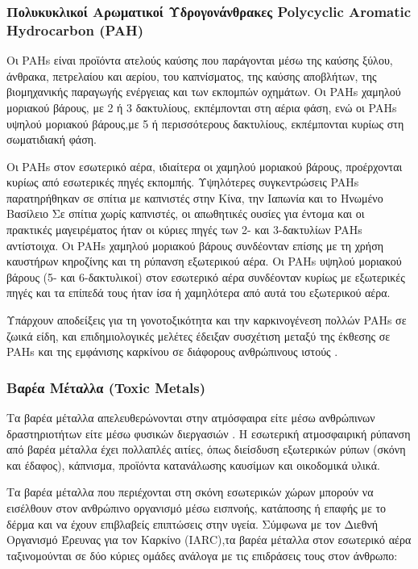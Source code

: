 \subsubsection{Πολυκυκλικοί Αρωματικοί Υδρογονάνθρακες Polycyclic Aromatic Hydrocarbon (PAH)}


Οι PAHs είναι προϊόντα ατελούς καύσης που παράγονται μέσω της καύσης ξύλου, άνθρακα, πετρελαίου και αερίου, του καπνίσματος, της καύσης αποβλήτων, της βιομηχανικής παραγωγής ενέργειας και των εκπομπών οχημάτων. Οι PAHs χαμηλού μοριακού βάρους, με 2 ή 3 δακτυλίους, εκπέμπονται στη αέρια φάση, ενώ οι PAHs υψηλού μοριακού βάρους,με 5 ή περισσότερους δακτυλίους, εκπέμπονται κυρίως στη σωματιδιακή φάση.

 Οι PAHs στον εσωτερικό αέρα, ιδιαίτερα οι χαμηλού μοριακού βάρους, προέρχονται κυρίως από εσωτερικές πηγές εκπομπής. Υψηλότερες συγκεντρώσεις PAHs παρατηρήθηκαν σε σπίτια με καπνιστές στην Κίνα, την Ιαπωνία και το Ηνωμένο Βασίλειο 
 Σε σπίτια χωρίς καπνιστές, οι απωθητικές ουσίες για έντομα και οι πρακτικές μαγειρέματος ήταν οι κύριες πηγές των 2- και 3-δακτυλίων PAHs αντίστοιχα. Οι PAHs χαμηλού μοριακού βάρους συνδέονταν επίσης με τη χρήση καυστήρων κηροζίνης και τη ρύπανση εξωτερικού αέρα. Οι PAHs υψηλού μοριακού βάρους (5- και 6-δακτυλικοί) στον εσωτερικό αέρα συνδέονταν κυρίως με εξωτερικές πηγές και τα επίπεδά τους ήταν ίσα ή χαμηλότερα από αυτά του εξωτερικού αέρα.


Υπάρχουν αποδείξεις για τη γονοτοξικότητα και την καρκινογένεση πολλών PAHs σε ζωικά είδη, και επιδημιολογικές μελέτες έδειξαν συσχέτιση μεταξύ της έκθεσης σε PAHs και της εμφάνισης καρκίνου σε διάφορους ανθρώπινους ιστούς \cite{ijerph17238972}.


 \subsubsection{Βαρέα Μέταλλα (Toxic Metals)}


Τα βαρέα μέταλλα απελευθερώνονται στην ατμόσφαιρα είτε μέσω ανθρώπινων δραστηριοτήτων είτε μέσω φυσικών διεργασιών . Η εσωτερική ατμοσφαιρική ρύπανση από βαρέα μέταλλα έχει πολλαπλές αιτίες, όπως διείσδυση εξωτερικών ρύπων (σκόνη και έδαφος), κάπνισμα, προϊόντα κατανάλωσης καυσίμων και οικοδομικά υλικά.

Τα βαρέα μέταλλα που περιέχονται στη σκόνη εσωτερικών χώρων μπορούν να εισέλθουν στον ανθρώπινο οργανισμό μέσω εισπνοής, κατάποσης ή επαφής με το δέρμα και να έχουν επιβλαβείς επιπτώσεις στην υγεία. Σύμφωνα με τον Διεθνή Οργανισμό Έρευνας για τον Καρκίνο (IARC),τα βαρέα μέταλλα στον εσωτερικό αέρα ταξινομούνται σε δύο κύριες ομάδες ανάλογα με τις επιδράσεις τους στον άνθρωπο:

